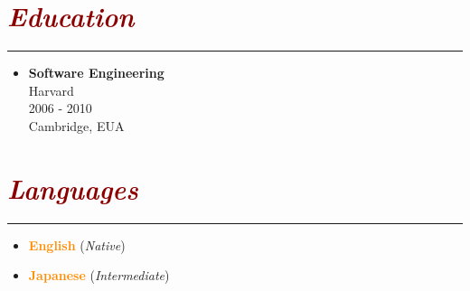 \documentclass[11pt,a4paper]{article}
\newcommand{\customsection}[1]{
    \section*{\textcolor{darkred}{{{\textbf{\textit{#1}}}}}}

    \vspace{-2em}
    \textcolor{darkred}{\rule{\textwidth}{0.4pt}}

}
\begin{document}
\customsection{Education}

\begin{itemize}[leftmargin=*]
	\item \textcolor{lightred}{\textbf{Software Engineering}} \\
	\faInstitution \hspace{0.1cm} Harvard \\
	\hspace*{-0.1cm} \faCalendar \hspace{0.15cm} 2006 - 2010 \\
	\hspace*{-0.025cm} \faMapMarker \hspace{0.21cm} Cambridge, EUA
\end{itemize}

\customsection{Languages}

\begin{itemize}[leftmargin=*]
	\item \textcolor{darkorange}{\textbf{English}} (\textit{Native})
	\item \textcolor{darkorange}{\textbf{Japanese}} (\textit{Intermediate})
\end{itemize}
\end{document}
